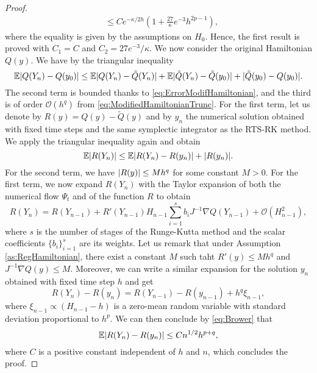 \documentclass{siamart1116}
\numberwithin{theorem}{section}
\DeclarePairedDelimiter{\abs}{\lvert}{\rvert}
\newcommand{\OO}{\mathcal{O}}
\newcommand{\E}{\operatorname{\mathbb{E}}}
\begin{document}
\begin{proof}
\begin{equation}
\begin{aligned}
&\leq Ce^{-\kappa/2h}(1 + \frac{27}{\kappa}e^{-3} h^{2p-1}),
\end{aligned}
\end{equation}
where the equality is given by the assumptions on $H_0$. Hence, the first result is proved with $C_1 = C$ and $C_2 = 27e^{-3}/\kappa$. We now consider the original Hamiltonian $Q(y)$. We have by the triangular inequality
\begin{equation}
	\E\abs{Q(Y_n) - Q(y_0)} \leq \E\abs{Q(Y_n) - \tilde Q(Y_n)} + \E\abs{\tilde Q(Y_n) - \tilde Q(y_0)} + \abs{\tilde Q(y_0) - Q(y_0)}.
\end{equation}
The second term is bounded thanks to \eqref{eq:ErrorModifHamiltonian}, and the third is of order $\OO(h^q)$ from \eqref{eq:ModifiedHamiltonianTrunc}. For the first term, let us denote by $R(y) = Q(y) - \tilde Q(y)$ and by $y_n$ the numerical solution obtained with fixed time steps and the same symplectic integrator as the RTS-RK method. We apply the triangular inequality again and obtain
\begin{equation}
	\E\abs{R(Y_n)} \leq \E\abs{R(Y_n) - R(y_n)} + \abs{R(y_n)}.
\end{equation}
For the second term, we have $\abs{R(y)} \leq Mh^q$ for some constant $M > 0$. For the first term, we now expand $R(Y_n)$ with the Taylor expansion of both the numerical flow $\Psi_t$ and of the function $R$ to obtain
\begin{equation}
	R(Y_n) = R(Y_{n-1}) + R'(Y_{n-1})H_{n-1}\sum_{i=1}^{s}b_i J^{-1}\nabla Q(Y_{n-1}) + \OO(H_{n-1}^2),
\end{equation} 
where $s$ is the number of stages of the Runge-Kutta method and the scalar coefficients $\{b_i\}_{i=1}^s$ are its weights. Let us remark that under Assumption \ref{as:RegHamiltonian}, there exist a constant $M$ such taht $R'(y) \leq M h^q$ and $J^{-1}\nabla Q(y) \leq M$. Moreover, we can write a similar expansion for the solution $y_n$ obtained with fixed time step $h$ and get
\begin{equation}
	R(Y_n) - R(y_n) = R(Y_{n-1}) - R(y_{n-1}) + h^q \xi_{n-1},
\end{equation}
where $\xi_{n-1} \propto (H_{n-1} - h)$ is a zero-mean random variable with standard deviation proportional to $h^p$. We can then conclude by \eqref{eq:Brower} that
\begin{equation}
	\E\abs{R(Y_n) - R(y_n)} \leq C n^{1/2} h^{p+q},
\end{equation}
where $C$ is a positive constant independent of $h$ and $n$, which concludes the proof.
\end{proof}
\end{document}
